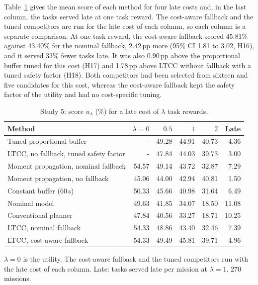 \documentclass[a4paper,fleqn]{cas-dc}
\newcommand{\mname}{LTCC}  %
\newcommand{\uprighttext}{\def\textbf##1{##1}\def\textit##1{##1}}
\newcounter{prop}
\begin{document}
Table~\ref{tab:s5} gives the mean score of each method for four late costs and, in the last column, the tasks served
late at one task reward. The cost-aware fallback and the tuned competitors are run for the late cost of each column,
so each column is a separate comparison. At one task reward, the cost-aware fallback scored 45.81\% against
43.40\% for the nominal fallback, 2.42\,pp more (95\% CI 1.81 to 3.02, H16), and
it served 33\% fewer tasks late. It was also 0.90\,pp above the proportional buffer
tuned for this cost (H17) and 1.78\,pp above \mname{} without fallback with a tuned safety factor
(H18). Both competitors had been selected from sixteen and five candidates for this cost, whereas the cost-aware
fallback kept the safety factor of the utility and had no cost-specific tuning.

\begingroup\uprighttext
\begin{table}[t]
\caption{Study 5: score $u_\lambda$ (\%) for a late cost of $\lambda$ task rewards.}\label{tab:s5}
\centering\small
\begin{threeparttable}
\begin{tabular}{lrrrrr}
\toprule
Method & $\lambda = 0$ & $0.5$ & $1$ & $2$ & Late \\
\midrule
Tuned proportional buffer & - & 49.28 & 44.91 & 40.73 & 4.36 \\
\mname{}, no fallback, tuned safety factor & - & 47.84 & 44.03 & 39.73 & 3.00 \\
Moment propagation, nominal fallback & 54.57 & 49.14 & 43.72 & 32.87 & 7.29 \\
Moment propagation, no fallback & 45.06 & 44.00 & 42.94 & 40.81 & 1.50 \\
Constant buffer (60\,s) & 50.33 & 45.66 & 40.98 & 31.64 & 6.49 \\
Nominal model & 49.63 & 41.85 & 34.07 & 18.50 & 11.08 \\
Conventional planner & 47.84 & 40.56 & 33.27 & 18.71 & 10.25 \\
\mname{}, nominal fallback & 54.33 & 48.86 & 43.40 & 32.46 & 7.39 \\
\mname{}, cost-aware fallback & 54.33 & 49.49 & 45.81 & 39.71 & 4.96 \\
\bottomrule
\end{tabular}
\begin{tablenotes}[flushleft]\scriptsize
\item[] $\lambda=0$ is the utility. The cost-aware fallback and the tuned competitors run with the late cost of each column. Late: tasks served late per mission at $\lambda=1$. 270 missions.
\end{tablenotes}
\end{threeparttable}
\end{table}
\endgroup
\end{document}

